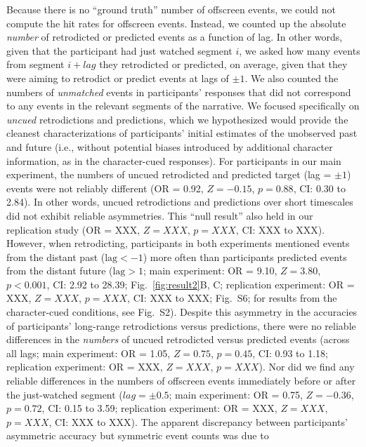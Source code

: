 \documentclass[10pt]{article}
\newcommand{\events}{S2}
\newcommand{\hitRates}{S6}
\begin{document}
Because there is no ``ground truth'' number of offscreen events, we could not
compute the hit rates for offscreen events. Instead, we counted up the absolute
\textit{number} of retrodicted or predicted events as a function of lag. In
other words, given that the participant had just watched segment $i$, we asked
how many events from segment $i + lag$ they retrodicted or predicted, on
average, given that they were aiming to retrodict or predict events at lags of
$\pm 1$. We also counted the numbers of \textit{unmatched} events in
participants' responses that did not correspond to any events in the relevant
segments of the narrative. We focused specifically on \textit{uncued}
retrodictions and predictions, which we hypothesized would provide the cleanest
characterizations of participants' initial estimates of the unobserved past and
future (i.e., without potential biases introduced by additional character
information, as in the character-cued responses). For participants in our main
experiment, the numbers of uncued retrodicted and predicted target (lag = $\pm
1$) events were not reliably different (OR = 0.92, $Z = -0.15$, $p = 0.88$, CI:
0.30 to 2.84). In other words, uncued retrodictions and predictions over short
timescales did not exhibit reliable asymmetries. This ``null result'' also held
in our replication study (OR = XXX, $Z = XXX$, $p = XXX$, CI: XXX to XXX).
However, when retrodicting, participants in both experiments mentioned events
from the distant past ($\mathrm{lag} < -1$) more often than participants
predicted events from the distant future ($\mathrm{lag} > 1$; main experiment:
OR = 9.10, $Z = 3.80$, $p < 0.001$, CI: 2.92 to 28.39; Fig.~\ref{fig:result2}B,
C; replication experiment: OR = XXX, $Z = XXX$, $p = XXX$, CI: XXX to XXX;
Fig.~\hitRates; for results from the character-cued conditions, see
Fig.~\events). Despite this asymmetry in the accuracies of participants'
long-range retrodictions versus predictions, there were no reliable differences
in the \textit{numbers} of uncued retrodicted versus predicted events (across
all lags; main experiment: OR = 1.05, $Z = 0.75$, $p = 0.45$, CI: 0.93 to 1.18;
replication experiment: OR = XXX, $Z = XXX$, $p = XXX$). Nor did we find any
reliable differences in the numbers of offscreen events immediately before or
after the just-watched segment ($lag = \pm 0.5$; main experiment: OR = 0.75, $Z
= -0.36$, $p = 0.72$, CI: 0.15 to 3.59; replication experiment: OR = XXX, $Z =
XXX$, $p = XXX$, CI: XXX to XXX). The apparent discrepancy between
participants' asymmetric accuracy but symmetric event counts was due to
\end{document}
